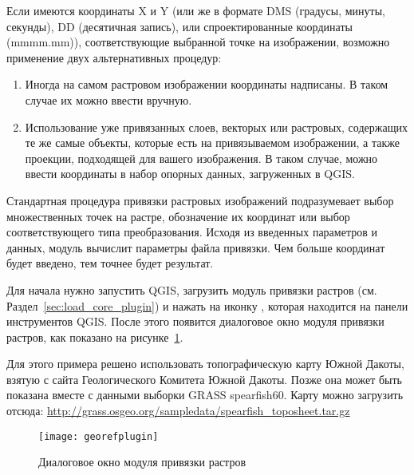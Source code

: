 
Если имеются координаты X и Y (или же в формате DMS (градусы, минуты,
секунды), DD (десятичная запись), или спроектированные координаты
(mmmm.mm)), соответствующие выбранной точке на изображении, возможно
применение двух альтернативных процедур:

\begin{enumerate}
\item Иногда на самом растровом изображении координаты надписаны.
В таком случае их можно ввести вручную.
\item Использование уже привязанных слоев, векторых или растровых,
содержащих те же самые объекты, которые есть на привязываемом
изображении, а также проекции, подходящей для вашего изображения.
В таком случае, можно ввести координаты в набор опорных данных,
загруженных в QGIS.
\end{enumerate}

Стандартная процедура привязки растровых изображений подразумевает выбор
множественных точек на растре, обозначение их координат или выбор
соответствующего типа преобразования. Исходя из введенных параметров и
данных, модуль вычислит параметры файла привязки. Чем больше координат
будет введено, тем точнее будет результат.

Для начала нужно запустить QGIS, загрузить модуль привязки растров
(см. Раздел~\ref{sec:load_core_plugin}) и нажать на иконку
, которая находится на
панели инструментов QGIS. После этого появится диалоговое окно модуля
привязки растров, как показано на рисунке~\ref{fig:georefplugin}.

Для этого примера решено использовать топографическую карту Южной
Дакоты, взятую с сайта Геологического Комитета Южной Дакоты. Позже она
может быть показана вместе с данными выборки GRASS spearfish60. Карту
можно загрузить отсюда:
\url{http://grass.osgeo.org/sampledata/spearfish_toposheet.tar.gz}

\begin{figure}[ht]
\centering
  \texttt{[image: georefplugin]}
  \caption{Диалоговое окно модуля привязки растров \nixcaption}\label{fig:georefplugin}
\end{figure}

\label{georeferencer_entering}

